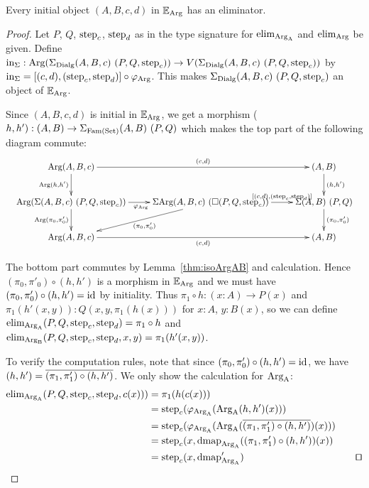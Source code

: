 \documentclass[orivec,envcountsame, ,envcountsect]{llncs}
\begin{document}
\begin{proposition}
\label{thm:init-to-elim}
Every initial object $(A, B, c, d)$ in $\mathbb{E}_{\text{Arg}}$ has an eliminator.
\end{proposition}
\begin{proof}
  Let $P$, $Q$, $\text{step}_{c}$, $\text{step}_{d}$ as in the type signature for $\text{elim}_{\text{Arg}_{\text{A}}}$
  and $\text{elim}_{\text{Arg}}$ be given. Define $\text{in}_{\Sigma} :
  \text{Arg}(\Sigma_{\text{Dialg}} (A, B, c)\ (P, Q, \text{step}_{c})) \to V(\Sigma_{\text{Dialg}}
  (A, B, c)\ (P, Q, \text{step}_{c}))$ by $\text{in}_{\Sigma} = [(c, d), (\text{step}_{c},
    \text{step}_{d})] \circ \varphi_{\text{Arg}}$. This makes
  $\Sigma_{\text{Dialg}} (A, B, c)\ (P, Q, \text{step}_{c})$ an object of
  $\mathbb{E}_{\text{Arg}}$.

  Since $(A, B, c, d)$ is initial in $\mathbb{E}_{\text{Arg}}$, we get a morphism ($h, h') :
  (A, B) \to \Sigma_{\text{Fam}(\text{Set})} (A, B)\ (P, Q)$ which makes the top part of the
  following diagram commute:
\[
\resizebox{1\textwidth}{!}{%
\xymatrix{
\ArgB(A, B, c) \ar^-{(c, d)}[rr] \ar_-{\ArgB(h, h')}[d] & & (A, B) \ar^-{(h, h')}[d] \\
\ArgB(\Sigma (A, B, c)\ (P, Q, \stepind{c})) \ar_{\varphi_{\ArgB}}[r] \ar_-{\ArgB(\pi_0, \pi'_0)}[d]
 & \Sigma \ArgB(A, B, c)\ (\BOX(P, Q, \stepind{c}))  \ar^-{\sigmamorph{(c,d)}{(\stepind{c},\stepind{d})}}[r] \ar^{(\pi_0, \pi'_0)}[dl]
 & \Sigma (A, B)\ (P, Q) \ar^-{(\pi_0, \pi'_0)}[d]\\
\ArgB(A, B, c) \ar_-{(c, d)}[rr] & & (A, B)
}
}
\]

The bottom part commutes by Lemma~\ref{thm:isoArgAB} and
calculation. Hence $(\pi_0, \pi'_0) \circ (h, h')$ is a morphism in
$\mathbb{E}_{\text{Arg}}$ and we must have $(\pi_0, \pi'_0) \circ (h, h')
= \text{id}$ by initiality. Thus $\pi_1 \circ h : (x : A) \to P(x)$ and
$\pi_1(h'(x, y)) : Q(x, y, \pi_1(h(x)))$ for $x : A$, $y : B(x)$, so
we can define $\text{elim}_{\text{Arg}_{\text{A}}}(P, Q, \text{step}_{c}, \text{step}_{d}) = \pi_1 \circ h$ and
$\text{elim}_{\text{Arg}_{\text{B}}}(P, Q, \text{step}_{c}, \text{step}_{d}, x, y) = \pi_1(h'(x, y))$. 

To verify the computation rules, note that since $(\pi_0, \pi'_0)
\circ (h, h') = \text{id}$, we have $(h, h') = \overline{(\pi_1, \pi'_1)
  \circ (h, h')}$. We only show the calculation for $\text{Arg}_{\text{A}}$:
\begin{align*}
  \elim_{\ArgA}(P, Q, \stepind{c}, \stepind{d}, c(x)))
 &= \pi_1(h(c(x))) \\
 &= \stepind{c}(\varphi_{\ArgA}(\ArgA(h, h')(x))) \\
 &= \stepind{c}(\varphi_{\ArgA}(\ArgA(\CwFsect{(\pi_1, \pi'_1) \circ (h, h')})(x))) \\
 &= \stepind{c}(x, \dmap_{\ArgA}((\pi_1, \pi'_1) \circ (h, h'))(x)) \\
 &= \stepind{c}(x, \dmap_{\ArgA}') & \text{\qed}
\end{align*}
\end{proof}
\end{document}
